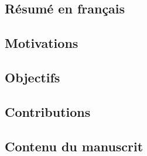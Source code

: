 \begin{bibunit}
%
%
%
%
%


\chapter*{Résumé en français}

\section*{Motivations}

\section*{Objectifs}

\section*{Contributions}

\section*{Contenu du manuscrit}


\end{bibunit}
